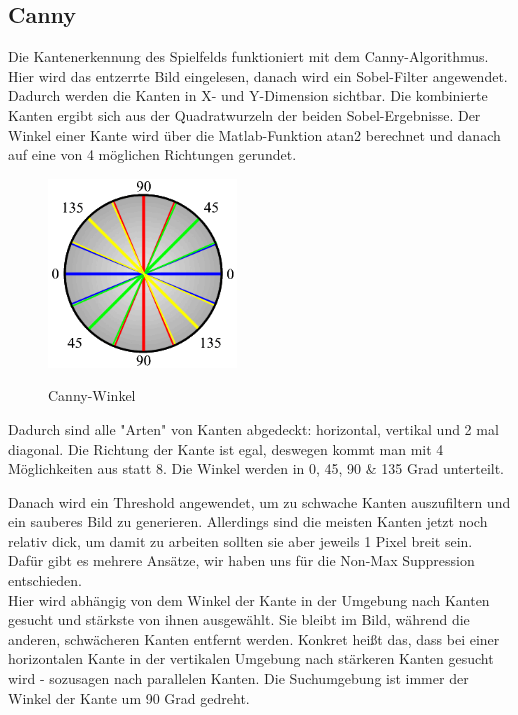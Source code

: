 \documentclass[paper=A4, deutsch]{scrartcl}
\begin{document}
\subsection{Canny}
Die Kantenerkennung des Spielfelds funktioniert mit dem Canny-Algorithmus. Hier wird das entzerrte Bild eingelesen, danach wird ein Sobel-Filter angewendet. Dadurch werden die Kanten in X- und Y-Dimension sichtbar. Die kombinierte Kanten ergibt sich aus der Quadratwurzeln der beiden Sobel-Ergebnisse. Der Winkel einer Kante wird über die Matlab-Funktion atan2 berechnet und danach auf eine von 4 möglichen Richtungen gerundet. \\

\begin{figure}[ht]
	\centering
		\includegraphics[width=5cm]{CannyEdgeWheel.png}\\
	\caption[Canny-Winkel]{Canny-Winkel}
	\label{fig:nettop}
\end{figure}

Dadurch sind alle "Arten" von Kanten abgedeckt: horizontal, vertikal und 2 mal diagonal. Die Richtung der Kante ist egal, deswegen kommt man mit 4 Möglichkeiten aus statt 8. Die Winkel werden  in 0, 45, 90 \& 135 Grad unterteilt.

Danach wird ein Threshold angewendet, um zu schwache Kanten auszufiltern und ein sauberes Bild zu generieren. Allerdings sind die meisten Kanten jetzt noch relativ dick, um damit zu arbeiten sollten sie aber jeweils 1 Pixel breit sein. Dafür gibt es mehrere Ansätze, wir haben uns für die Non-Max Suppression entschieden.\\
Hier wird abhängig von dem Winkel der Kante in der Umgebung nach Kanten gesucht und stärkste von ihnen ausgewählt. Sie bleibt im Bild, während die anderen, schwächeren Kanten entfernt werden. Konkret heißt das, dass bei einer horizontalen Kante in der vertikalen Umgebung nach stärkeren Kanten gesucht wird - sozusagen nach parallelen Kanten. Die Suchumgebung ist immer der Winkel der Kante um 90 Grad gedreht. \cite{canny1}
\end{document}
